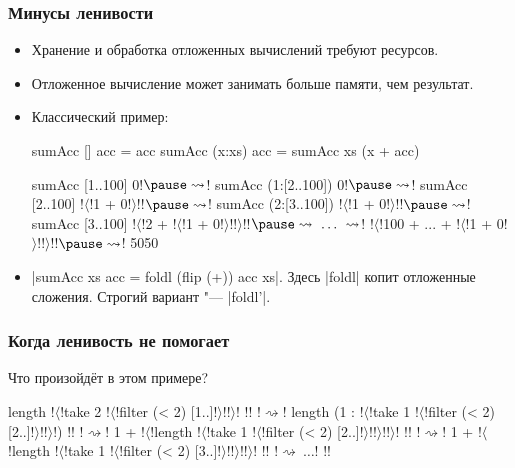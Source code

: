 \documentclass[11pt]{beamer}
\begin{document}
\begin{frame}[fragile]
  \frametitle{Минусы ленивости}
  \small
  \begin{itemize}
    \item Хранение и обработка отложенных вычислений требуют ресурсов.
    \item Отложенное вычисление может занимать больше памяти, чем результат.
    \item Классический пример:
          \begin{haskellsmall}
            sumAcc [] acc = acc
            sumAcc (x:xs) acc = sumAcc xs (x + acc)

            sumAcc [1..100] 0!$\pause \rightsquigarrow$! sumAcc (1:[2..100]) 0!$\pause \rightsquigarrow$!
            sumAcc [2..100] !$\langle$!1 + 0!$\rangle$!!$\pause \rightsquigarrow$! sumAcc (2:[3..100]) !$\langle$!1 + 0!$\rangle$!!$\pause \rightsquigarrow$!
            sumAcc [3..100] !$\langle$!2 + !$\langle$!1 + 0!$\rangle$!!$\rangle$!!$\pause \rightsquigarrow \ \ldots\ \rightsquigarrow$!
            !$\langle$!100 + ... + !$\langle$!1 + 0!$\rangle$!!$\rangle$!!$\pause \rightsquigarrow $! 5050
          \end{haskellsmall}
    \item \haskinline|sumAcc xs acc = foldl (flip (+)) acc xs|.
          Здесь \haskinline|foldl| копит отложенные сложения. Строгий вариант "--- \haskinline|foldl'|.
  \end{itemize}
\end{frame}

\begin{frame}[fragile]
  \frametitle{Когда ленивость не помогает}
  Что произойдёт в этом примере?
  \begin{haskellsmall}
    length !$\langle$!take 2 !$\langle$!filter (< 2) [1..]!$\rangle$!!$\rangle$! !! !$\rightsquigarrow$!
    length (1 : !$\langle$!take 1 !$\langle$!filter (< 2) [2..]!$\rangle$!!$\rangle$!) !! !$\rightsquigarrow$!
    1 + !$\langle$!length !$\langle$!take 1 !$\langle$!filter (< 2) [2..]!$\rangle$!!$\rangle$!!$\rangle$! !! !$\rightsquigarrow$!
    1 + !$\langle$!length !$\langle$!take 1 !$\langle$!filter (< 2) [3..]!$\rangle$!!$\rangle$!!$\rangle$! !! !$\rightsquigarrow\ \ldots$! !!
  \end{haskellsmall}
\end{frame}
\end{document}
